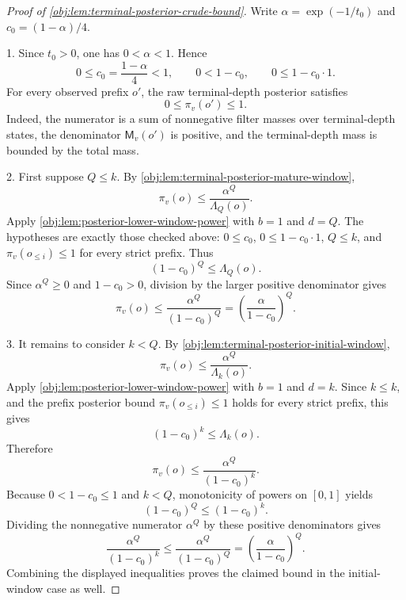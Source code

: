 \begin{proof}[Proof of \cref{obj:lem:terminal-posterior-crude-bound}]
Write \(\alpha=\exp(-1/t_0)\) and \(c_0=(1-\alpha)/4\).

1. Since \(t_0>0\), one has \(0<\alpha<1\). Hence
\[
0\le c_0=\frac{1-\alpha}{4}<1,
\qquad
0<1-c_0,
\qquad
0\le 1-c_0\cdot 1 .
\]
For every observed prefix \(o'\), the raw terminal-depth posterior satisfies
\[
0\le \pi_v(o')\le 1.
\]
Indeed, the numerator is a sum of nonnegative filter masses over terminal-depth states, the denominator \(\mathsf M_v(o')\) is positive, and the terminal-depth mass is bounded by the total mass. %

2. First suppose \(Q\le k\). By \cref{obj:lem:terminal-posterior-mature-window},
\[
\pi_v(o)\le \frac{\alpha^Q}{\Lambda_Q(o)} .
\]
Apply \cref{obj:lem:posterior-lower-window-power} with \(b=1\) and \(d=Q\). The hypotheses are exactly those checked above: \(0\le c_0\), \(0\le 1-c_0\cdot 1\), \(Q\le k\), and \(\pi_v(o_{\le i})\le 1\) for every strict prefix. Thus
\[
(1-c_0)^Q\le \Lambda_Q(o).
\]
Since \(\alpha^Q\ge 0\) and \(1-c_0>0\), division by the larger positive denominator gives
\[
\pi_v(o)
\le
\frac{\alpha^Q}{(1-c_0)^Q}
=
\left(\frac{\alpha}{1-c_0}\right)^Q .
\]

3. It remains to consider \(k<Q\). By \cref{obj:lem:terminal-posterior-initial-window},
\[
\pi_v(o)\le \frac{\alpha^Q}{\Lambda_k(o)} .
\]
Apply \cref{obj:lem:posterior-lower-window-power} with \(b=1\) and \(d=k\). Since \(k\le k\), and the prefix posterior bound \(\pi_v(o_{\le i})\le 1\) holds for every strict prefix, this gives
\[
(1-c_0)^k\le \Lambda_k(o).
\]
Therefore
\[
\pi_v(o)
\le
\frac{\alpha^Q}{(1-c_0)^k}.
\]
Because \(0<1-c_0\le 1\) and \(k<Q\), monotonicity of powers on \([0,1]\) yields
\[
(1-c_0)^Q\le (1-c_0)^k .
\]
Dividing the nonnegative numerator \(\alpha^Q\) by these positive denominators gives
\[
\frac{\alpha^Q}{(1-c_0)^k}
\le
\frac{\alpha^Q}{(1-c_0)^Q}
=
\left(\frac{\alpha}{1-c_0}\right)^Q .
\]
Combining the displayed inequalities proves the claimed bound in the initial-window case as well. %
\end{proof}
